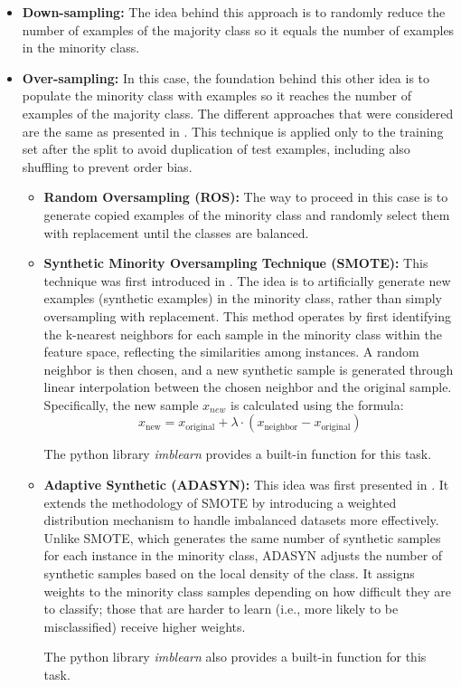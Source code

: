 \begin{itemize}
    \item \textbf{Down-sampling:} The idea behind this approach is to randomly reduce the number of examples of the majority class so it equals the number of examples in the minority class.
    \item \textbf{Over-sampling:} In this case, the foundation behind this other idea is to populate the minority class with examples so it reaches the number of examples of the majority class. The different approaches that were considered are the same as presented in \cite{rathpisey-2019}. This technique is applied only to the training set after the split to avoid duplication of test examples, including also shuffling to prevent order bias.
        \begin{itemize}
            \item \textbf{Random Oversampling (ROS):} The way to proceed in this case is to generate copied examples of the minority class and randomly select them with replacement until the classes are balanced.
            
            \item \textbf{Synthetic Minority Oversampling Technique (SMOTE):} This technique was first introduced in \cite{chawla-2002}. The idea is to artificially generate new examples (synthetic examples) in the minority class, rather than simply oversampling with replacement. This method operates by first identifying the k-nearest neighbors for each sample in the minority class within the feature space, reflecting the similarities among instances. A random neighbor is then chosen, and a new synthetic sample is generated through linear interpolation between the chosen neighbor and the original sample. Specifically, the new sample $x_{new}$ is calculated using the formula:
            \begin{equation}
                x_{\text{new}} = x_{\text{original}} + \lambda \cdot (x_{\text{neighbor}} - x_{\text{original}})
            \end{equation}
            
            The python library \textit{imblearn} provides a built-in function for this task.
            
            \item \textbf{Adaptive Synthetic (ADASYN):} This idea was first presented in \cite{he-2008}. It extends the methodology of SMOTE by introducing a weighted distribution mechanism to handle imbalanced datasets more effectively. Unlike SMOTE, which generates the same number of synthetic samples for each instance in the minority class, ADASYN adjusts the number of synthetic samples based on the local density of the class. It assigns weights to the minority class samples depending on how difficult they are to classify; those that are harder to learn (i.e., more likely to be misclassified) receive higher weights. 
            
            The python library \textit{imblearn} also provides a built-in function for this task.
        \end{itemize}
\end{itemize}


